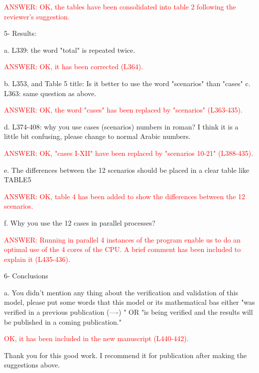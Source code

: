 \documentclass[a4paper]{article}
\begin{document}
\textcolor{red}{ANSWER: OK, the tables have been consolidated into table 2
following the reviewer's suggestion.}

5- Results:

a. L339: the word "total" is repeated twice.

\textcolor{red}{ANSWER: OK, it has been corrected (L364).}

b. L353, and Table 5 title: Is it better to use the word "scenarios" than "cases"
c. L363: same question as above.

\textcolor{red}{ANSWER: OK, the word "cases" has been replaced by "scenarios"
(L363-435).}

d. L374-408: why you use cases (scenarios) numbers in roman? I think it is a little bit confusing, please change to normal Arabic numbers.

\textcolor{red}{ANSWER: OK, "cases I-XII" have been replaced by "scenarios
10-21" (L388-435).}

e. The differences between the 12 scenarios should be placed in a clear table like TABLE5

\textcolor{red}{ANSWER: OK, table 4 has been added to show the differences
between the 12 scenarios.}

f. Why you use the 12 cases in parallel processes?

\textcolor{red}{ANSWER: Running in parallel 4 instances of the program enable us
to do an optimal use of the 4 cores of the CPU. A brief comment has been
included to explain it (L435-436).}

6- Conclusions

a. You didn't mention any thing about the verification and validation of this model, please put some words that this model or its mathematical bas either "was verified in a previous publication (----) " OR "is being verified and the results will be published in a coming publication."

\textcolor{red}{OK, it has been included in the new manuscript (L440-442).}

Thank you for this good work. I recommend it for publication after making the suggestions above. 
\end{document}
